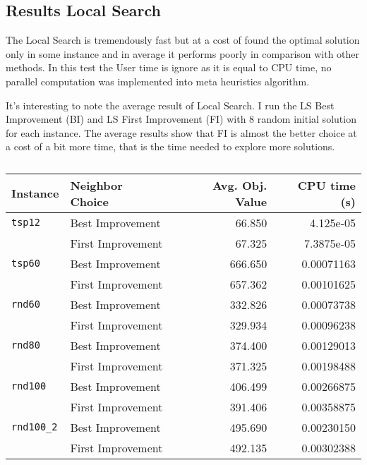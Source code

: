 \subsection{Results Local Search}
	The Local Search is tremendously fast but at a cost of found the optimal solution only in some instance and in average it performs poorly in comparison with other methods. In this test the User time is ignore as it is equal to CPU time, no parallel computation was implemented into meta heuristics algorithm.

	It's interesting to note the average result of Local Search. I run the LS Best Improvement (BI) and LS First Improvement (FI) with 8 random initial solution for each instance. The average results show that FI is almost the better choice at a cost of a bit more time, that is the time needed to explore more solutions.

	\begin{table}
		\centering
		\begin{tabular}{llrr}
			\toprule
			\textbf{Instance} & \textbf{Neighbor Choice} & \textbf{Avg. Obj. Value} & \textbf{CPU time (s)} \\
			\midrule
			\verb|tsp12| 	& Best Improvement & 66.850 & 4.125e-05 \\
							& First Improvement & 67.325 & 7.3875e-05 \\
			\midrule
			\verb|tsp60| 	& Best Improvement & 666.650 & 0.00071163 \\
							& First Improvement & 657.362 & 0.00101625 \\
			\midrule
			\verb|rnd60| 	& Best Improvement & 332.826 & 0.00073738 \\
							& First Improvement & 329.934 & 0.00096238 \\
			\midrule
			\verb|rnd80| 	& Best Improvement & 374.400 & 0.00129013 \\
							& First Improvement & 371.325 & 0.00198488 \\
			\midrule
			\verb|rnd100| 	& Best Improvement & 406.499 & 0.00266875 \\
					      	& First Improvement & 391.406 & 0.00358875 \\
			\midrule
			\verb|rnd100_2| & Best Improvement & 495.690 & 0.00230150 \\
							& First Improvement & 492.135 & 0.00302388 \\
			\bottomrule
		\end{tabular}
		\caption{\label{tab:AvgResultLS}}
	\end{table}
	

